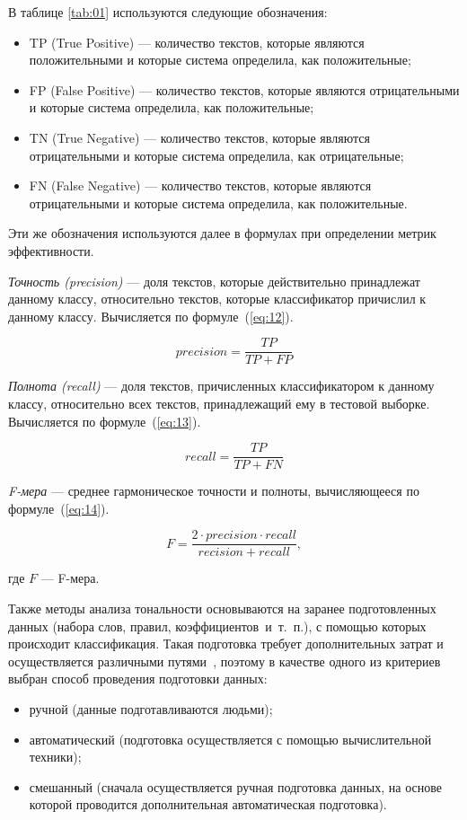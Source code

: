 В таблице \ref{tab:01} используются следующие обозначения:
\begin{itemize}
    \item TP (True Positive) --- количество текстов, которые являются
        положительными и которые система определила, как положительные;
    \item FP (False Positive) --- количество текстов, которые являются
        отрицательными и которые система определила, как положительные;
    \item TN (True Negative) --- количество текстов, которые являются
        отрицательными и которые система определила, как отрицательные;
    \item FN (False Negative) --- количество текстов, которые являются
        отрицательными и которые система определила, как положительные.
\end{itemize}

Эти же обозначения используются далее в формулах при определении метрик
эффективности.

\textit{Точность (precision)} --- доля текстов, которые действительно принадлежат данному
классу, относительно текстов, которые классификатор причислил к данному
классу. Вычисляется по формуле~(\ref{eq:12}).

\begin{equation}\label{eq:12}
    precision = \frac{TP}{TP + FP}
\end{equation}

\textit{Полнота (recall)} --- доля текстов, причисленных классификатором к
данному классу, относительно всех текстов, принадлежащий ему в тестовой
выборке. Вычисляется по формуле~(\ref{eq:13}).

\begin{equation}\label{eq:13}
    recall = \frac{TP}{TP + FN}
\end{equation}

\textit{F-мера} --- среднее гармоническое точности и полноты, вычисляющееся
по формуле~(\ref{eq:14}).

\begin{equation}\label{eq:14}
    F = \frac{2 \cdot precision \cdot recall}{recision + recall},
\end{equation}

где $F$ --- F-мера.

Также методы анализа тональности основываются на заранее подготовленных данных
(набора слов, правил, коэффициентов~и~т.~п.), с помощью которых происходит
классификация. Такая подготовка требует дополнительных затрат и осуществляется
различными путями~\cite{article21}, поэтому в качестве одного из критериев
выбран способ проведения подготовки данных:
\begin{itemize}
    \item ручной (данные подготавливаются людьми);
    \item автоматический (подготовка осуществляется с помощью вычислительной
        техники);
    \item смешанный (сначала осуществляется ручная подготовка данных, на основе
        которой проводится дополнительная автоматическая подготовка).
\end{itemize}

